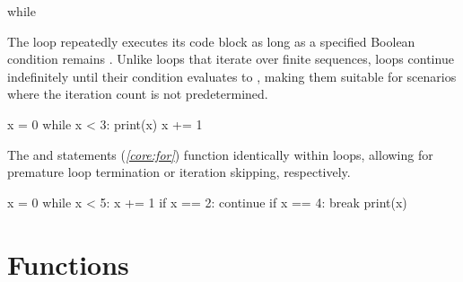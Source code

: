 \documentclass[10pt]{article}
\begin{document}
    \begin{core}{while}

      The  loop repeatedly executes its code block as long as a specified Boolean condition remains . Unlike  loops that iterate over finite sequences,  loops continue indefinitely until their condition evaluates to , making them suitable for scenarios where the iteration count is not predetermined.

      \begin{pyconsole}

        x = 0
        while x < 3:
            print(x)
            x += 1

      \end{pyconsole}
      
      The  and  statements (\textit{\autoref{core:for}}) function identically within  loops, allowing for premature loop termination or iteration skipping, respectively.

      \begin{pyconsole}

        x = 0
        while x < 5:
            x += 1
            if x == 2:
                continue
            if x == 4:
                break
            print(x)

      \end{pyconsole}

    \end{core}

\section{Functions}
  \label{sec:functions}
\end{document}
